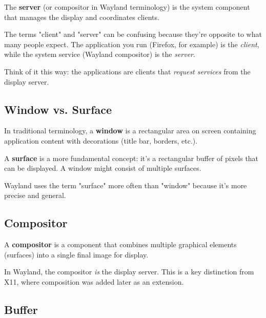 \begin{definition}[Server]
The \textbf{server} (or compositor in Wayland terminology) is the system component that manages the display and coordinates clients.
\end{definition}

\begin{warningbox}
The terms "client" and "server" can be confusing because they're opposite to what many people expect. The application you run (Firefox, for example) is the \textit{client}, while the system service (Wayland compositor) is the \textit{server}.

Think of it this way: the applications are clients that \textit{request services} from the display server.
\end{warningbox}

\subsection{Window vs. Surface}

\begin{definition}[Window]
In traditional terminology, a \textbf{window} is a rectangular area on screen containing application content with decorations (title bar, borders, etc.).
\end{definition}

\begin{definition}[Surface]
A \textbf{surface} is a more fundamental concept: it's a rectangular buffer of pixels that can be displayed. A window might consist of multiple surfaces.
\end{definition}

Wayland uses the term "surface" more often than "window" because it's more precise and general.

\subsection{Compositor}

\begin{definition}[Compositor]
A \textbf{compositor} is a component that combines multiple graphical elements (surfaces) into a single final image for display.
\end{definition}

In Wayland, the compositor \textit{is} the display server. This is a key distinction from X11, where composition was added later as an extension.

\subsection{Buffer}

